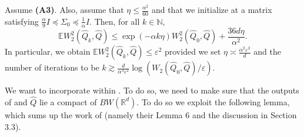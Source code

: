 \begin{theorem}
\label{th: lambert}
Assume \textbf{(A3)}. Also, assume that $\eta \leq \frac{\alpha^2}{60}$ and that we initialize  at a matrix satisfying $\frac{\alpha}{9} I \preceq \Sigma_{0} \preceq \frac{1}{\alpha} I$. Then, for all $k \in \mathbb{N}$,
$$
\mathbb{E} W_2^2\left(\hat{Q}_k, \hat{Q}\right) \leq \exp (-\alpha k \eta) W_2^2\left(\hat{Q}_0, \hat{Q}\right)+\frac{36 d \eta}{\alpha^2} .
$$
In particular, we obtain $\mathbb{E} W_2^2\left(\hat{Q}_k, \hat{Q}\right) \leq \varepsilon^2$ provided we set $\eta \asymp \frac{\alpha^2 \varepsilon^2}{d}$ and the number of iterations to be $k \gtrsim \frac{d}{\alpha^3 \varepsilon^2} \log \left(W_2\left(\hat{Q}_0, \hat{Q}\right) / \varepsilon\right)$.
\end{theorem}
We want to incorporate  within . To do so, we need to make sure that the outputs of  and $\hat{Q}$ lie a compact of $BW(\mathbb{R}^d)$. To do so we exploit the following lemma, which sums up the work of \citet{lambert2022variational} (namely their Lemma 6 and the discussion in Section 3.3). 

